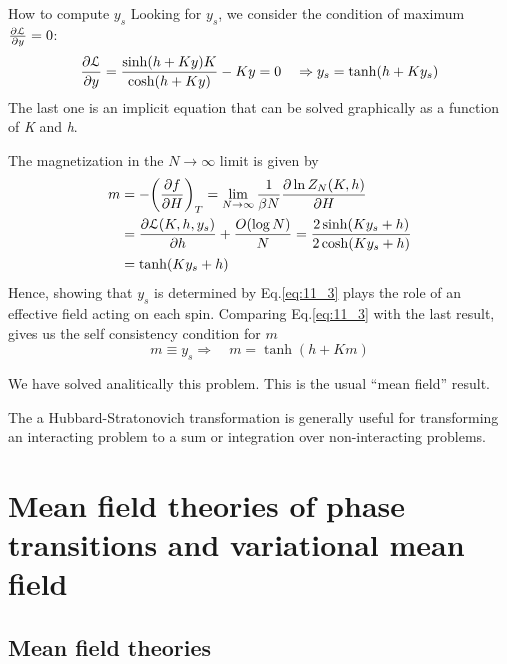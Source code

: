 \documentclass[../main/main.tex]{subfiles}
\begin{document}
\begin{example}{How to compute \( y_s \)}{}
Looking for \( y_s \), we consider the condition of maximum \( \pdv{\mathcal{L} }{y} = 0  \):
\begin{equation}
  \pdv{\mathcal{L}}{y} = \frac{\sinh (h+Ky)K}{\cosh (h+Ky)} - Ky = 0 \quad   \Rightarrow y_s = \tanh (h+Ky_s)
  \label{eq:11_3}
\end{equation}
The last one is an implicit equation that can be solved graphically as a function of \emph{K} and \emph{h}.
\end{example}

The magnetization in the \( N \rightarrow \infty  \) limit is given by
\begin{equation*}
\begin{split}
m  &= - \qty( \pdv{f}{H})_T = \lim_{N \rightarrow \infty } \frac{1}{\beta N} \pdv{\ln{Z_N(K,h)} }{H}   \\
& =  \pdv{\mathcal{L} (K,h,y_s) }{h}  + \frac{O ( \log{N} )}{N} = \frac{2 \sinh(Ky_s+h)}{2 \cosh(K y_s+h)} \\
& = \tanh (K y_s +h)
\end{split}
\end{equation*}
Hence, showing that \(y_s\) is determined by Eq.\eqref{eq:11_3} plays the role of an effective field acting on each spin. Comparing Eq.\eqref{eq:11_3} with the last result, gives us the self consistency condition for \(m\)
\begin{equation}
   m \equiv y_s \Rightarrow \quad m = \tanh (h+Km)
\end{equation}
\begin{remark}
We have solved analitically this problem.
This is the usual “mean field” result.
\end{remark}
\begin{remark}
The a Hubbard-Stratonovich transformation is generally useful for transforming an interacting problem to a sum or integration over non-interacting problems.
\end{remark}











\chapter{Mean field theories of phase transitions and variational mean field}

\section{Mean field theories}
\end{document}
